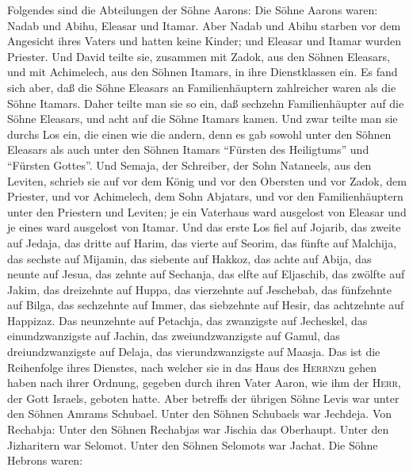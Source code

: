  Folgendes sind die Abteilungen der Söhne Aarons: Die
Söhne Aarons waren: Nadab und Abihu, Eleasar und Itamar. 
Aber Nadab und Abihu starben vor dem Angesicht ihres Vaters und hatten
keine Kinder; und Eleasar und Itamar wurden Priester.  Und
David teilte sie, zusammen mit Zadok, aus den Söhnen Eleasars, und mit
Achimelech, aus den Söhnen Itamars, in ihre Dienstklassen ein.
 Es fand sich aber, daß die Söhne Eleasars an
Familienhäuptern zahlreicher waren als die Söhne Itamars. Daher teilte
man sie so ein, daß sechzehn Familienhäupter auf die Söhne Eleasars, und
acht auf die Söhne Itamars kamen.  Und zwar teilte man sie
durchs Los ein, die einen wie die andern, denn es gab sowohl unter den
Söhnen Eleasars als auch unter den Söhnen Itamars ``Fürsten des
Heiligtums'' und ``Fürsten Gottes''.  Und Semaja, der
Schreiber, der Sohn Nataneels, aus den Leviten, schrieb sie auf vor dem
König und vor den Obersten und vor Zadok, dem Priester, und vor
Achimelech, dem Sohn Abjatars, und vor den Familienhäuptern unter den
Priestern und Leviten; je ein Vaterhaus ward ausgelost von Eleasar und
je eines ward ausgelost von Itamar.  Und das erste Los
fiel auf Jojarib, das zweite auf Jedaja,  das dritte auf
Harim, das vierte auf Seorim,  das fünfte auf Malchija,
das sechste auf Mijamin,  das siebente auf Hakkoz, das
achte auf Abija,  das neunte auf Jesua, das zehnte auf
Sechanja,  das elfte auf Eljaschib, das zwölfte auf
Jakim,  das dreizehnte auf Huppa, das vierzehnte auf
Jeschebab,  das fünfzehnte auf Bilga, das sechzehnte auf
Immer,  das siebzehnte auf Hesir, das achtzehnte auf
Happizaz.  Das neunzehnte auf Petachja, das zwanzigste
auf Jecheskel,  das einundzwanzigste auf Jachin, das
zweiundzwanzigste auf Gamul,  das dreiundzwanzigste auf
Delaja, das vierundzwanzigste auf Maasja.  Das ist die
Reihenfolge ihres Dienstes, nach welcher sie in das Haus des
\textsc{Herrn}zu gehen haben nach ihrer Ordnung, gegeben durch ihren
Vater Aaron, wie ihm der \textsc{Herr}, der Gott Israels, geboten hatte.
 Aber betreffs der übrigen Söhne Levis war unter den
Söhnen Amrams Schubael. Unter den Söhnen Schubaels war Jechdeja.
 Von Rechabja: Unter den Söhnen Rechabjas war Jischia das
Oberhaupt.  Unter den Jizharitern war Selomot. Unter den
Söhnen Selomots war Jachat.  Die Söhne Hebrons waren:

